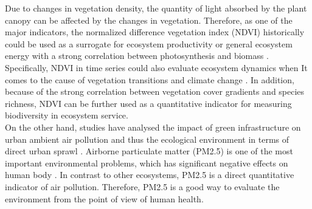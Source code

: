 Due to changes in vegetation density, the quantity of light absorbed by the plant canopy can be affected by the changes in vegetation. Therefore, as one of the major indicators, the normalized difference vegetation index (NDVI) historically could be used as a surrogate for ecosystem productivity or general ecosystem energy with a strong correlation between photosynthesis and biomass \parencite{phillips_evaluating_2008}.\\

Specifically, NDVI in time series could also evaluate ecosystem dynamics when It comes to the cause of vegetation transitions and climate change \parencite{zewdie_monitoring_2017}. In addition, because of the strong correlation between vegetation cover gradients and species richness, NDVI can be further used as a quantitative indicator for measuring biodiversity in ecosystem service.\\

On the other hand, studies have analysed the impact of green infrastructure on urban ambient air pollution and thus the ecological environment in terms of direct urban sprawl \parencite{bonilla-duarte_contribution_2021}. Airborne particulate matter (PM2.5) is one of the most important environmental problems, which has significant negative effects on human body \parencite{wu_effects_2018}. In contrast to other ecosystems, PM2.5 is a direct quantitative indicator of air pollution. Therefore, PM2.5 is a good way to evaluate the environment from the point of view of human health.\\
